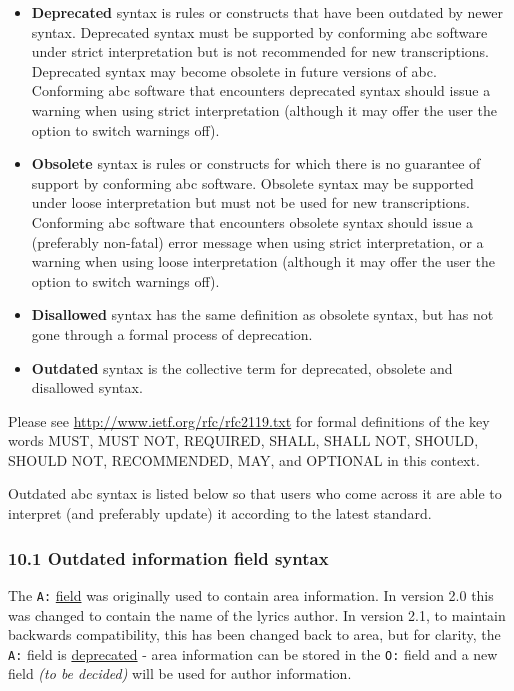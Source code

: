 \begin{itemize}
\item
  \textbf{Deprecated} syntax is rules or constructs that have been
  outdated by newer syntax. Deprecated syntax must be supported by
  conforming abc software under strict interpretation but is not
  recommended for new transcriptions. Deprecated syntax may become
  obsolete in future versions of abc. Conforming abc software that
  encounters deprecated syntax should issue a warning when using strict
  interpretation (although it may offer the user the option to switch
  warnings off).
\item
  \textbf{Obsolete} syntax is rules or constructs for which there is no
  guarantee of support by conforming abc software. Obsolete syntax may
  be supported under loose interpretation but must not be used for new
  transcriptions. Conforming abc software that encounters obsolete
  syntax should issue a (preferably non-fatal) error message when using
  strict interpretation, or a warning when using loose interpretation
  (although it may offer the user the option to switch warnings off).
\item
  \textbf{Disallowed} syntax has the same definition as obsolete syntax,
  but has not gone through a formal process of deprecation.
\item
  \textbf{Outdated} syntax is the collective term for deprecated,
  obsolete and disallowed syntax.
\end{itemize}

Please see \url{http://www.ietf.org/rfc/rfc2119.txt} for formal
definitions of the key words MUST, MUST NOT, REQUIRED, SHALL, SHALL NOT,
SHOULD, SHOULD NOT, RECOMMENDED, MAY, and OPTIONAL in this context.

Outdated abc syntax is listed below so that users who come across it are
able to interpret (and preferably update) it according to the latest
standard.

\hypertarget{outdated_information_field_syntax}{\subsubsection{10.1
Outdated information field
syntax}\label{outdated_information_field_syntax}}

The \texttt{A:} \protect\hyperlink{aarea}{field} was originally used to
contain area information. In version 2.0 this was changed to contain the
name of the lyrics author. In version 2.1, to maintain backwards
compatibility, this has been changed back to area, but for clarity, the
\texttt{A:} field is \protect\hyperlink{outdated_syntax}{deprecated} -
area information can be stored in the \texttt{O:} field and a new field
\emph{(to be decided)} will be used for author information.

